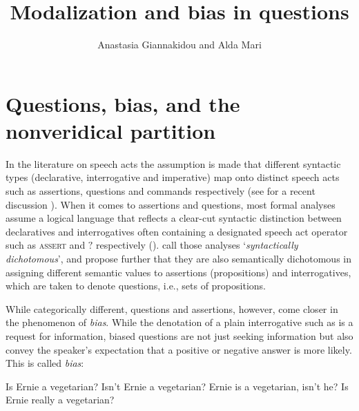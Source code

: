 \documentclass[output=paper,colorlinks,citecolor=brown]{langscibook}
\author{Anastasia Giannakidou\orcid{0000-0003-2266-9410}\affiliation{University of Chicago} and Alda Mari\orcid{0000-0002-9479-9110}\affiliation{Institut Jean Nicod, CNRS/ENS/EHESS/PSL}}
\title{Modalization and bias in questions}
\begin{document}
\maketitle

\section{Questions, bias, and the nonveridical partition} \label{sec:02:intro}

In the literature on speech acts the assumption is made that different syntactic types (declarative, interrogative and imperative) map onto distinct speech acts such as assertions, questions and commands respectively (see for a recent discussion  \citealt{portner2018}).  When it comes to assertions and questions, most formal  analyses  assume a logical language that reflects a clear-cut syntactic distinction between declaratives and interrogatives often containing a designated speech act operator such as \textsc{assert} and $?$ respectively (\citealt{krifka1995}). \citet{ciardelli2013} call those analyses `\textit{syntactically dichotomous}', and propose further that they are also semantically dichotomous in assigning different semantic values to assertions (propositions) and interrogatives, which are taken to denote questions, i.e., sets of propositions. 





While categorically different,   questions and  assertions, however,  come closer in the phenomenon of \textit{bias}. While the denotation of a plain interrogative such as  is a request for information, biased questions  are not just seeking information but also convey the speaker's expectation that a positive or negative answer is more likely. This is called \textit{bias}:

\ea \label{ex:ernie:veggie} Is Ernie a vegetarian?
\ex \label{ex:ernie:veggie:bias}
    \ea \label{ex:ernie:high:neg} Isn't Ernie a vegetarian?		
    \ex \label{ex:ernie:neg:tag} Ernie is a vegetarian, isn't he?  	
    \ex \label{ex:ernie:adv} Is Ernie really a vegetarian? 	
\z 
\z



\end{document}
